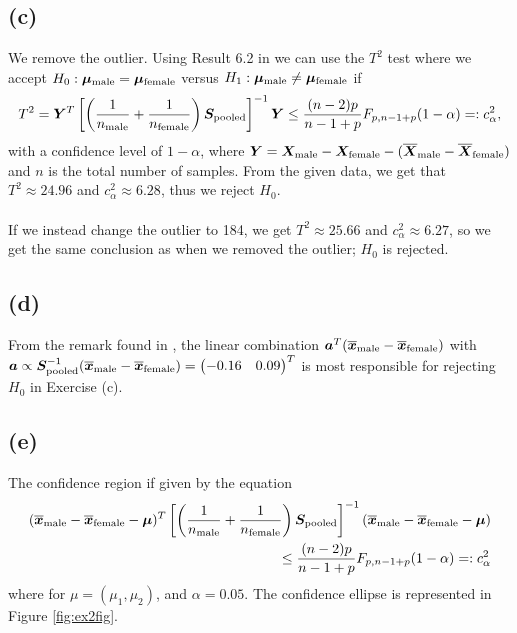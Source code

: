 \message{ !name(examination.tex)}\documentclass[one column]{report}
\renewcommand{\b}[1]{\bm{#1}}
\newcommand{\mean}[1]{\overline{\b{#1}}}
\begin{document}
\subsection*{(c)}
\label{sec:c-1}
We remove the outlier.
 Using Result 6.2 in \cite[p. 286]{book} we can use the $T^{2}$ test
 where we accept $H_{0}:\b \mu_{\rm male} = \b \mu_{\rm female}$ versus
 $H_{1}:\b \mu_{\rm male} \neq \b \mu_{\rm female}$ if 
\begin{equation*}
T^{2} = \b Y^{T}
\left[
  \left(
    \frac{1}{n_{\rm male}} + \frac{1}{n_{\rm female}}
  \right)
  \b S_{\rm pooled}
\right]^{-1} \b Y
\leq \frac{(n-2)p}{n-1+p}F_{p, n-1+p}(1-\alpha) =:c^{2}_{\alpha},
\end{equation*}
with a confidence level of $1-\alpha$, where $\b Y = \b X_{\rm male}- \b
X_{\rm female} - (\mean X_{\rm male}- \mean X_{\rm female} )$ and $n$ is the total number of samples. From the given data, we get that
 $T^{2}\approx 24.96 $
and $c^{2}_{\alpha} \approx 6.28$, thus we reject $H_{0}$. \\
\\
If we instead change the outlier to 184, we get $T^{2} \approx 25.66$ and
$c_{\alpha}^{2} \approx  6.27$, so we get the same conclusion as when
we removed the outlier; $H_{0}$ is rejected.
\subsection*{(d)}
 From the remark found in \cite[p. 289]{book}, the linear combination
 $\b a^{T} (\mean x_{\rm male} - \mean x_{\rm female})$ with $\b a
 \propto \b S_{\rm pooled}^{-1}(\mean x_{\rm male} - \mean x_{\rm
   female}) =
 \begin{pmatrix}
   -0.16 &0.09
 \end{pmatrix}^{T}
$ is most responsible for rejecting $H_{0}$ in Exercise (c). 
\subsection*{(e)}
\label{sec:e}

The confidence region if given by the equation
\begin{align}
  \label{eq:ex2-conf-region}
 (\mean x_{\rm male}  - \mean x_{\rm female} - \b \mu)^{T}
\left[
  \left(
    \frac{1}{n_{\rm male}} + \frac{1}{n_{\rm female}}
  \right)
  \b S_{\rm pooled}
\right]^{-1} (\mean x_{\rm male}  - \mean x_{\rm female} - \b \mu) \nonumber
\\
\leq \frac{(n-2)p}{n-1+p}F_{p, n-1+p}(1-\alpha) =:c^{2}_{\alpha}
\end{align}
where for $\mu = (\mu_1, \mu_2)$, and $\alpha = 0.05$. The confidence
ellipse is represented in Figure \ref{fig:ex2fig}.
\end{document}
